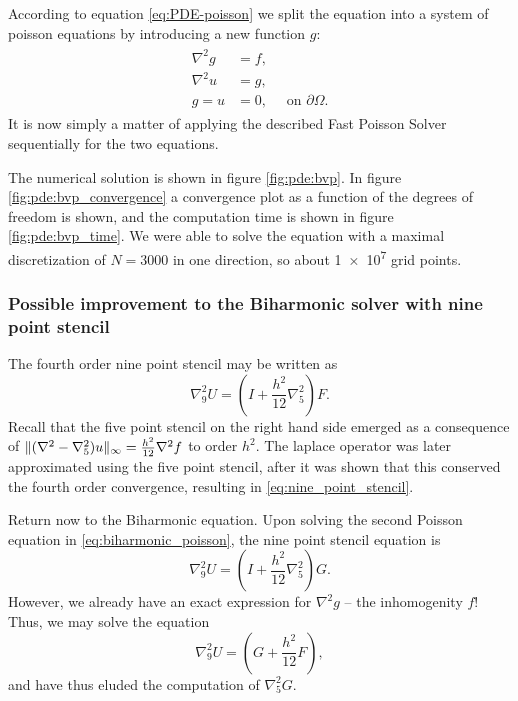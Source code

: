 According to equation \eqref{eq:PDE-poisson} we split the equation into a system of poisson equations by introducing a new function $g$:
\begin{align}\label{eq:biharmonic_poisson}
  \begin{split}
    \nabla^2g &= f,\\
    \nabla^2u &= g,\\
    g = u &= 0,\quad \text{ on } \partial \Omega.
  \end{split}
\end{align}
It is now simply a matter of applying the described Fast Poisson Solver sequentially for the two equations.

The numerical solution is shown in figure \ref{fig:pde:bvp}.
In figure \ref{fig:pde:bvp_convergence} a convergence plot as a function of the degrees of freedom is shown, and the computation time is shown in figure \ref{fig:pde:bvp_time}.
We were able to solve the equation with a maximal discretization of $N = 3000$ in one direction, so about \num{1e7} grid points.

\subsubsection{Possible improvement to the Biharmonic solver with nine point stencil}
The fourth order nine point stencil may be written as
\begin{equation}\label{eq:nine_point_stencil}
  \nabla_9^2 U
  = \left(I + \frac{h^2}{12} \nabla_5^2\right) F.
\end{equation}
Recall that the five point stencil on the right hand side emerged as a consequence of
$\lVert (\nabla^2 - \nabla_5^2)u \rVert_\infty = \frac{h^2}{12}\nabla^2 f$
to order $h^2$.
The laplace operator was later approximated using the five point stencil, after it was shown that this conserved the fourth order convergence, resulting in \eqref{eq:nine_point_stencil}.

Return now to the Biharmonic equation.
Upon solving the second Poisson equation in \eqref{eq:biharmonic_poisson}, the nine point stencil equation is
\begin{equation}
    \nabla_9^2 U
    = \left(I + \frac{h^2}{12} \nabla_5^2\right) G.
\end{equation}
However, we already have an exact expression for $\nabla^2 g$ -- the inhomogenity $f$!
Thus, we may solve the equation 
\begin{equation}
    \nabla_9^2 U
    = \left(G + \frac{h^2}{12} F\right),
\end{equation}
and have thus eluded the computation of $\nabla_5^2 G$.

